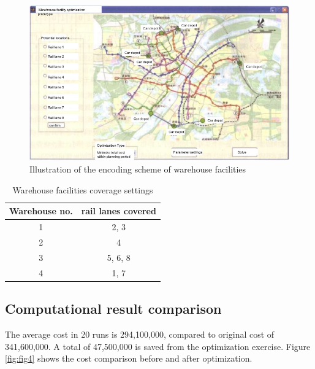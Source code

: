 \begin{figure}[h!]
	\begin{center}
		\includegraphics[width=0.8\linewidth]{sections/figure3.jpg}
		\caption{Illustration of the encoding scheme of warehouse facilities}
		\label{fig:fig3}
	\end{center}
\end{figure}


\begin{table}[h!]
	\begin{center}
		\caption{Warehouse facilities coverage settings}
		\label{tab:tab2}
		\begin{tabular}{cc}
			\hline
			Warehouse no. & rail lanes covered \\
			\hline
			1 & 2, 3\\
			2 & 4 \\
			3 & 5, 6, 8\\
			4 & 1, 7\\
			\hline
		\end{tabular}
	\end{center}
\end{table}


\subsection{Computational result comparison}
The average cost in 20 runs is 294,100,000, compared to original cost of 341,600,000.
A total of 47,500,000 is saved from the optimization exercise.
Figure \ref{fig:fig4} shows the cost comparison before and after optimization.


